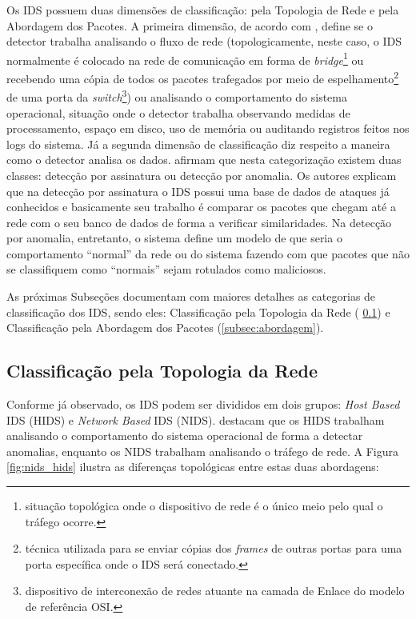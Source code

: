 Os IDS possuem duas dimensões de classificação: pela Topologia de Rede e pela Abordagem dos Pacotes. A primeira dimensão, de acordo com , define se o detector trabalha analisando o fluxo de rede (topologicamente, neste caso, o IDS normalmente é colocado na rede de comunicação em forma de \textit{bridge}\footnote{situação topológica onde o dispositivo de rede é o único meio pelo qual o tráfego ocorre.} ou recebendo uma cópia de todos os pacotes trafegados por meio de espelhamento\footnote{técnica utilizada para se enviar cópias dos \textit{frames} de outras portas para uma porta específica onde o IDS será conectado.} de uma porta da \textit{switch}\footnote{dispositivo de interconexão de redes atuante na camada de Enlace do modelo de referência OSI.}) ou analisando o comportamento do sistema operacional, situação onde o detector trabalha observando medidas de processamento, espaço em disco, uso de memória ou auditando registros feitos nos logs do sistema. Já a segunda dimensão de classificação diz respeito a maneira como o detector analisa os dados.  afirmam que nesta categorização existem duas classes: detecção por assinatura ou detecção por anomalia. Os autores explicam que na detecção por assinatura o IDS possui uma base de dados de ataques já conhecidos e basicamente seu trabalho é comparar os pacotes que chegam até a rede com o seu banco de dados de forma a verificar similaridades. Na detecção por anomalia, entretanto, o sistema define um modelo de que seria o comportamento ``normal'' da rede ou do sistema fazendo com que pacotes que não se classifiquem como ``normais'' sejam rotulados como maliciosos.


As próximas Subseções documentam com maiores detalhes as categorias de classificação dos IDS, sendo eles: Classificação pela Topologia da Rede (  \ref{subsec:topologia}) e Classificação pela Abordagem dos Pacotes (\ref{subsec:abordagem}).









\subsection{Classificação pela Topologia da Rede}
\label{subsec:topologia}


Conforme já observado, os IDS podem ser divididos em dois grupos: \textit{Host Based} IDS (HIDS) e \textit{Network Based} IDS (NIDS).  destacam que os HIDS trabalham analisando o comportamento do sistema operacional de forma a detectar anomalias, enquanto os NIDS trabalham analisando o tráfego de rede. A Figura \ref{fig:nids_hids} ilustra as diferenças topológicas entre estas duas abordagens:

